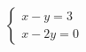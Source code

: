 $\displaystyle
\left\{
\begin{array}{l}
\displaystyle x - y = 3 \\
\displaystyle x-2y = 0
\end{array}
\right.
$
